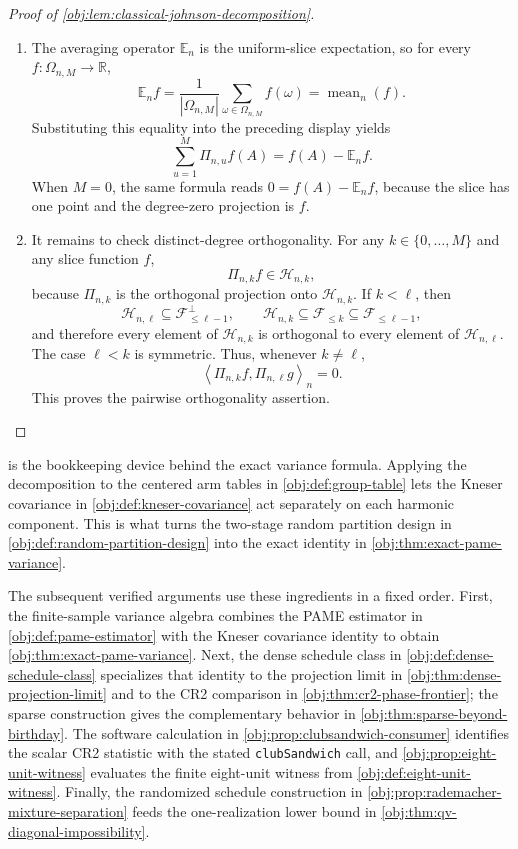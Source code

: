 \documentclass[11pt]{article}
\begin{document}
\begin{proof}[Proof of \cref{obj:lem:classical-johnson-decomposition}]
\begin{enumerate}
\item The averaging operator \(\mathbb E_n\) is the uniform-slice expectation, so for every \(f:\Omega_{n,M}\to\mathbb R\),
\[
\mathbb E_n f
=
\frac{1}{|\Omega_{n,M}|}\sum_{\omega\in\Omega_{n,M}}f(\omega)
=
\operatorname{mean}_n(f).
\]
Substituting this equality into the preceding display yields
\[
\sum_{u=1}^{M}\Pi_{n,u}f(A)
=
f(A)-\mathbb E_n f .
\]
When \(M=0\), the same formula reads \(0=f(A)-\mathbb E_n f\), because the slice has one point and the degree-zero projection is \(f\). %

\item It remains to check distinct-degree orthogonality. For any \(k\in\{0,\ldots,M\}\) and any slice function \(f\),
\[
\Pi_{n,k}f\in\mathcal H_{n,k},
\]
because \(\Pi_{n,k}\) is the orthogonal projection onto \(\mathcal H_{n,k}\). If \(k<\ell\), then
\[
\mathcal H_{n,\ell}\subseteq \mathcal F_{\le \ell-1}^{\perp},
\qquad
\mathcal H_{n,k}\subseteq \mathcal F_{\le k}\subseteq \mathcal F_{\le \ell-1},
\]
and therefore every element of \(\mathcal H_{n,k}\) is orthogonal to every element of \(\mathcal H_{n,\ell}\). The case \(\ell<k\) is symmetric. Thus, whenever \(k\ne \ell\),
\[
\left\langle \Pi_{n,k}f,\Pi_{n,\ell}g\right\rangle_n=0 .
\]
This proves the pairwise orthogonality assertion. %
\end{enumerate}
\end{proof}

 is the bookkeeping device behind the exact variance formula. Applying the decomposition to the centered arm tables in \cref{obj:def:group-table} lets the Kneser covariance in \cref{obj:def:kneser-covariance} act separately on each harmonic component. This is what turns the two-stage random partition design in \cref{obj:def:random-partition-design} into the exact identity in \cref{obj:thm:exact-pame-variance}.

The subsequent verified arguments use these ingredients in a fixed order. First, the finite-sample variance algebra combines the PAME estimator in \cref{obj:def:pame-estimator} with the Kneser covariance identity to obtain \cref{obj:thm:exact-pame-variance}. Next, the dense schedule class in \cref{obj:def:dense-schedule-class} specializes that identity to the projection limit in \cref{obj:thm:dense-projection-limit} and to the CR2 comparison in \cref{obj:thm:cr2-phase-frontier}; the sparse construction gives the complementary behavior in \cref{obj:thm:sparse-beyond-birthday}. The software calculation in \cref{obj:prop:clubsandwich-consumer} identifies the scalar CR2 statistic with the stated \texttt{clubSandwich} call, and \cref{obj:prop:eight-unit-witness} evaluates the finite eight-unit witness from \cref{obj:def:eight-unit-witness}. Finally, the randomized schedule construction in \cref{obj:prop:rademacher-mixture-separation} feeds the one-realization lower bound in \cref{obj:thm:qv-diagonal-impossibility}.
\end{document}

